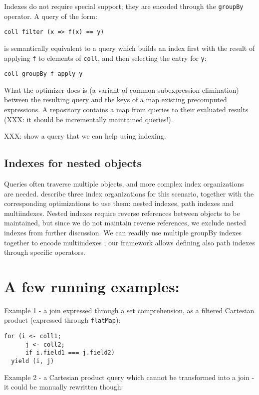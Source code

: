 \documentclass[preprint,authoryear,10pt]{sigplanconf}
\begin{document}
Indexes do not require special support; they are encoded through the
\texttt{groupBy} operator. A query of the form:

\begin{lstlisting}
coll filter (x => f(x) == y)
\end{lstlisting}
is semantically equivalent to a query which builds an index first with
the result of applying \texttt{f} to elements of \texttt{coll}, and then
selecting the entry for \texttt{y}:

\begin{lstlisting}
coll groupBy f apply y
\end{lstlisting}
What the optimizer does is (a variant of common subexpression
elimination) between the resulting query and the keys of a map existing
precomputed expressions. A repository contains a map from queries to
their evaluated results (XXX: it should be incrementally maintained
queries!).

XXX: show a query that we can help using indexing.

\subsection{Indexes for nested objects}

Queries often traverse multiple objects, and more complex index
organizations are needed. \citet{Bertino89} describe three index
organizations for this scenario, together with the corresponding
optimizations to use them: nested indexes, path indexes and
multiindexes. Nested indexes require reverse references between objects
to be maintained, but since we do not maintain reverse references, we
exclude nested indexes from further discussion. We can readily use
multiple groupBy indexes together to encode multiindexes
\citep{Bertino89}; our framework allows defining also path indexes
through specific operators.

\section{A few running examples:}

Example 1 - a join expressed through a set comprehension, as a filtered
Cartesian product (expressed through \texttt{flatMap}):

\begin{lstlisting}
for (i <- coll1;
      j <- coll2;
      if i.field1 === j.field2)
  yield (i, j)
\end{lstlisting}
Example 2 - a Cartesian product query which cannot be transformed into a
join - it could be manually rewritten though:
\end{document}
